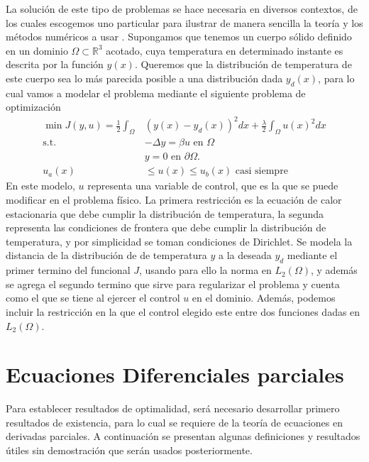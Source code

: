 \documentclass{article}
\begin{document}
\noindent
La solución de este tipo de problemas se hace necesaria en diversos contextos, de los cuales escogemos uno particular para ilustrar de manera sencilla la teoría y los métodos numéricos a usar . Supongamos que tenemos un cuerpo sólido definido en un dominio $\Omega\subset\mathbb{R}^3$ acotado, cuya temperatura en determinado instante es descrita por la función $y(x)$. Queremos que la distribución de temperatura de este cuerpo sea lo más parecida posible a una distribución dada $y_d(x)$, para lo cual vamos a modelar el problema mediante el siguiente problema de optimización
\begin{equation}
\label{prom2}
    \begin{split}
        \min J(y,u)=\frac{1}{2}\int_{\Omega}&(y(x)-y_d(x))^2dx+\frac{\lambda}{2}\int_{\Omega}u(x)^2dx\\
        \text{s.t.  }& -\Delta y=\beta u \text{ en } \Omega\\
        &y=0 \text{  en   }\partial\Omega.\\
        u_a(x)&\leq u(x)\leq u_b(x) \text{ casi siempre}
    \end{split}
\end{equation}
En este modelo, $u$ representa una variable de control, que es la que se puede modificar en el problema físico. La primera restricción es la ecuación de calor estacionaria que debe cumplir la distribución de temperatura, la segunda  representa las condiciones de frontera que debe cumplir la distribución de temperatura, y por simplicidad se toman condiciones de Dirichlet. Se modela la distancia de la distribución de de temperatura $y$ a la deseada $y_d$ mediante el primer termino del funcional $J$, usando para ello la norma en $L_2(\Omega)$, y además se agrega el segundo termino que sirve para regularizar el problema y cuenta como el que se tiene al ejercer el control $u$ en el dominio. Además, podemos incluir la restricción en la que el control elegido este entre dos funciones dadas en $L_2(\Omega).$\\
\section{Ecuaciones Diferenciales parciales}
Para establecer resultados de optimalidad, será necesario desarrollar primero resultados de existencia, para lo cual se requiere de la teoría de ecuaciones en derivadas parciales. A continuación se presentan algunas definiciones y resultados útiles sin demostración que serán usados posteriormente.\\
\end{document}
